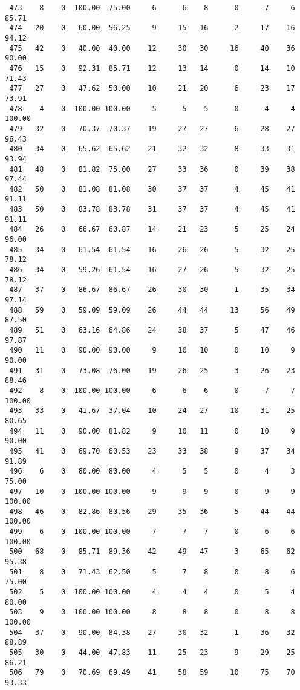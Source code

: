 \begin{verbatim}
 473    8    0  100.00  75.00     6      6    8      0      7     6    85.71
 474   20    0   60.00  56.25     9     15   16      2     17    16    94.12
 475   42    0   40.00  40.00    12     30   30     16     40    36    90.00
 476   15    0   92.31  85.71    12     13   14      0     14    10    71.43
 477   27    0   47.62  50.00    10     21   20      6     23    17    73.91
 478    4    0  100.00 100.00     5      5    5      0      4     4   100.00
 479   32    0   70.37  70.37    19     27   27      6     28    27    96.43
 480   34    0   65.62  65.62    21     32   32      8     33    31    93.94
 481   48    0   81.82  75.00    27     33   36      0     39    38    97.44
 482   50    0   81.08  81.08    30     37   37      4     45    41    91.11
 483   50    0   83.78  83.78    31     37   37      4     45    41    91.11
 484   26    0   66.67  60.87    14     21   23      5     25    24    96.00
 485   34    0   61.54  61.54    16     26   26      5     32    25    78.12
 486   34    0   59.26  61.54    16     27   26      5     32    25    78.12
 487   37    0   86.67  86.67    26     30   30      1     35    34    97.14
 488   59    0   59.09  59.09    26     44   44     13     56    49    87.50
 489   51    0   63.16  64.86    24     38   37      5     47    46    97.87
 490   11    0   90.00  90.00     9     10   10      0     10     9    90.00
 491   31    0   73.08  76.00    19     26   25      3     26    23    88.46
 492    8    0  100.00 100.00     6      6    6      0      7     7   100.00
 493   33    0   41.67  37.04    10     24   27     10     31    25    80.65
 494   11    0   90.00  81.82     9     10   11      0     10     9    90.00
 495   41    0   69.70  60.53    23     33   38      9     37    34    91.89
 496    6    0   80.00  80.00     4      5    5      0      4     3    75.00
 497   10    0  100.00 100.00     9      9    9      0      9     9   100.00
 498   46    0   82.86  80.56    29     35   36      5     44    44   100.00
 499    6    0  100.00 100.00     7      7    7      0      6     6   100.00
 500   68    0   85.71  89.36    42     49   47      3     65    62    95.38
 501    8    0   71.43  62.50     5      7    8      0      8     6    75.00
 502    5    0  100.00 100.00     4      4    4      0      5     4    80.00
 503    9    0  100.00 100.00     8      8    8      0      8     8   100.00
 504   37    0   90.00  84.38    27     30   32      1     36    32    88.89
 505   30    0   44.00  47.83    11     25   23      9     29    25    86.21
 506   79    0   70.69  69.49    41     58   59     10     75    70    93.33

\end{verbatim}
